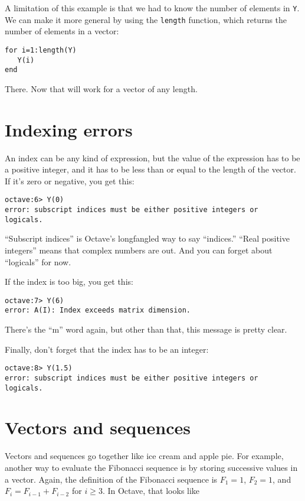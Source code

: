 A limitation of this example is that we had to know the number
of elements in {\tt Y}. We can make it more general by using
the {\tt length} function, which returns the number of elements
in a vector:

\begin{verbatim}
for i=1:length(Y)
   Y(i)
end
\end{verbatim}

There. Now that will work for a vector of any length.


\section{Indexing errors}

An index can be any kind of expression, but the value of the
expression has to be a positive integer, and it has to be
less than or equal to the length of the vector. If it's
zero or negative, you get this:

\begin{verbatim}
octave:6> Y(0)
error: subscript indices must be either positive integers or 
logicals.
\end{verbatim}

``Subscript indices'' is Octave's longfangled way to say ``indices.''
``Real positive integers'' means that complex numbers are
out. And you can forget about ``logicals'' for now.

If the index is too big, you get this:

\begin{verbatim}
octave:7> Y(6)
error: A(I): Index exceeds matrix dimension.
\end{verbatim}

There's the ``m'' word again, but other than that, this message
is pretty clear.

Finally, don't forget that the index has to be an integer:

\begin{verbatim}
octave:8> Y(1.5)
error: subscript indices must be either positive integers or
logicals.
\end{verbatim}


\section{Vectors and sequences}

Vectors and sequences go together like ice cream and apple pie. For
example, another way to evaluate the Fibonacci sequence is by
storing successive values in a vector. Again, the definition of the
Fibonacci sequence is $F_1 = 1$, $F_2 = 1$, and $F_{i} = F_{i-1} +
F_{i-2}$ for $i \ge 3$. In Octave, that looks like

